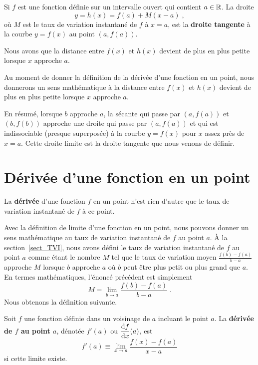 {

\begin{defn} 
Si $f$ est une fonction définie sur un intervalle ouvert qui contient
$a \in \mathbb{R}$.  La droite
\[
y = h(x) = f(a) + M(x-a) \; ,
\]
où $M$ est le taux de variation instantané de $f$ à $x=a$, est la
{\bfseries droite tangente} à la courbe
$y=f(x)$ au point $(a,f(a))$.

Nous avons que la distance entre $f(x)$ et $h(x)$ devient de plus en plus
petite lorsque $x$ approche $a$.
\end{defn}

Au moment de donner la définition de la dérivée d'une fonction en un
point, nous donnerons un sens mathématique à \lgm la distance entre $f(x)$
et $h(x)$ devient de plus en plus petite lorsque $x$ approche $a$\rgm.

En résumé, lorsque $b$ approche $a$, la sécante qui passe par
$(a,f(a))$ et $(b,f(b))$ approche une droite qui passe par $(a,f(a))$
et qui est indissociable (presque superposée) à la courbe $y=f(x)$
pour $x$ assez près de $x=a$.  Cette droite limite est la droite
tangente que nous venons de définir.

\section{Dérivée d'une fonction en un point}\label{def_der}

La {\bfseries dérivée} d'une fonction $f$ en un point n'est
rien d'autre que le taux de variation instantané de $f$ à ce point.

Avec la définition de limite d'une fonction en un point, nous pouvons
donner un sens mathéma\-tique au taux de variation instantané de $f$
au point $a$.  À la section~\ref{sect_TVI}, nous avons défini le taux de
variation instantané de $f$ au point $a$ comme étant le nombre $M$ tel
que le taux de variation moyen $\displaystyle \frac{f(b)-f(a)}{b-a}$
approche $M$ lorsque $b$ approche $a$ où $b$ peut être plus petit ou
plus grand que $a$.  En termes mathématiques, l'énoncé précédent est
simplement
\[
M = \lim_{b\rightarrow a} \frac{f(b)-f(a)}{b-a} \; .
\]
Nous obtenons la définition suivante.

\begin{defn} 
Soit $f$ une fonction définie dans un voisinage de $a$ incluant le
point $a$.  La {\bfseries dérivée de $f$ au point $a$}, dénotée
$f'(a)$ ou $\displaystyle \frac{\mathrm{d}f}{\mathrm{d}x}(a)$, est
\[
f'(a) \equiv \lim_{x\rightarrow a} \frac{f(x) - f(a)}{x-a}
\]
si cette limite existe.


\end{defn}}
